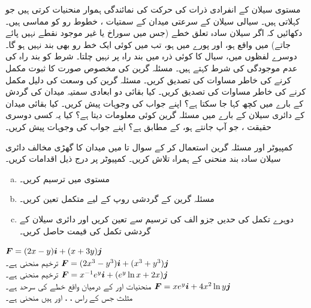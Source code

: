 مستوی  سیلان کے انفرادی ذرات کی حرکت کی نمائندگی       ہموار منحنیات کرتی ہیں جو     کہلاتی ہیں۔ سیالی سیلان کے  سرعتی  میدان کے  سمتیات   ، خطوط  رو کو مماسی  ہیں۔دکھائیں  کہ اگر سیلان سادہ تعلق خطے   (جس میں سوراخ یا    غیر موجود نقطے نہیں پائے جاتے) میں واقع ہو، اور پورے  میں  ہو، تب  میں کوئی ایک خط رو بھی بند  نہیں ہو گا۔ دوسرے لفظوں میں، سیال کا کوئی ذرہ  میں بند راہ پر نہیں چلتا۔ شرط  کو   بند  راہ کی عدم موجودگی کی شرط کہتے ہیں۔
مسئلہ گرین کی  مخصوص صورت کا ثبوت  مکمل کرنے کی خاطر مساوات   کی تصدیق کریں۔
مسئلہ گرین کی وسعت کی دلیل  مکمل کرنے کی خاطر  مساوات  کی تصدیق کریں۔
کیا بقائی  دو ابعادی  سمتیہ میدان  کی گردش کے بارے میں کچھ کہا جا سکتا ہے؟ اپنے جواب کی وجوہات پیش کریں۔
کیا  بقائی میدان کے دائری سیلان کے بارے میں مسئلہ گرین کوئی معلومات دیتا ہے؟ کیا یہ کسی دوسری حقیقت ، جو آپ جانتے ہو، کے مطابق ہے؟ اپنے جواب کی وجوہات پیش کریں۔

کمپیوٹر اور مسئلہ گرین  استعمال کر کے  سوال  تا  میں  میدان   کا گھڑی مخالف دائری سیلان سادہ بند منحنی   کے ہمراہ  تلاش کریں۔ کمپیوٹر پر  درج ذیل  اقدامات  کریں۔
\begin{enumerate}[a.]
\item
مستوی  میں  ترسیم کریں۔
\item
مسئلہ گرین کے گردشی  روپ کے لیے متکمل  تعین کریں۔
\item
دوہرے تکمل کی حدیں جزو الف کی ترسیم سے تعین کریں اور دائری سیلان کے گردشی تکمل  کی قیمت حاصل کریں۔
\end{enumerate}

\({{\boldsymbol{F}}}=(2x-y){\boldsymbol{i}}+(x+3y){\boldsymbol{j}}\)\\
ترخیم  منحنی  ہے۔
\({{\boldsymbol{F}}}=(2x^3-y^3){\boldsymbol{i}}+(x^3+y^3){\boldsymbol{j}}\)\\
ترخیم  منحنی  ہے۔
\({{\boldsymbol{F}}}=x^{-1}e^y{\boldsymbol{i}}+(e^y\ln x+2x){\boldsymbol{j}}\)\\
منحنیات   اور  کے درمیان واقع خطے کی سرحد  ہے۔
\({{\boldsymbol{F}}}=xe^y{\boldsymbol{i}}+4x^2\ln y{\boldsymbol{j}}\)\\
مثلث جس کے راس ، ، اور  ہیں منحنی  ہے۔


